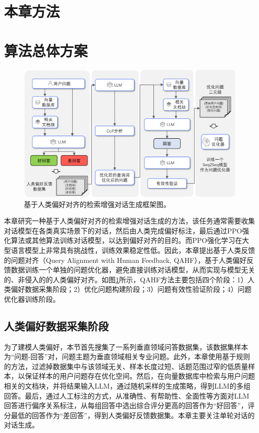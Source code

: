 \section{本章方法}

\section{算法总体方案}

\begin{figure}[htbp]
	\centering
	\includegraphics[scale=0.55]{Fig/qahf_framework.png}
	\caption{\label{qahf_framework}基于人类偏好对齐的检索增强对话生成框架图。}
\end{figure}

本章研究一种基于人类偏好对齐的检索增强对话生成的方法，该任务通常需要收集对话模型在各类真实场景下的对话，然后由人类完成偏好标注，最后通过PPO强化算法或其他算法训练对话模型，以达到偏好对齐的目的。而PPO强化学习在大型语言模型上非常具有挑战性，训练效果稳定性低。因此，本章提出基于人类反馈的问题对齐（Query Alignment with Human Feedback, QAHF），基于人类偏好反馈数据训练一个单独的问题优化器，避免直接训练对话模型，从而实现与模型无关的、非侵入的的人类偏好对齐。如图\ref{qahf_framework}所示，QAHF方法主要包括四个阶段：1）人类偏好数据采集阶段；2）优化问题构建阶段；3）问题有效性验证阶段；4）问题优化器训练阶段。

\subsection{人类偏好数据采集阶段}

为了建模人类偏好，本节首先搜集了一系列垂直领域问答数据集，该数据集样本为“问题-回答”对，问题主题为垂直领域相关专业问题。此外，本章使用基于规则的方法，过滤掉数据集中与该领域无关、样本长度过短、话题范围过窄的低质量样本，以保证样本的用户问题存在优化空间。然后，在向量数据库中检索与用户问题相关的文档块，并将结果输入LLM，通过随机采样的生成策略，得到LLM的多组回答。最后，通过人工标注的方式，从准确性、有帮助性、全面性等方面对LLM回答进行偏序关系标注，从每组回答中选出综合评分更高的回答作为“好回答”，评分最低的回答作为“差回答”，得到人类偏好反馈数据集。本章主要关注单轮对话的对话生成。

